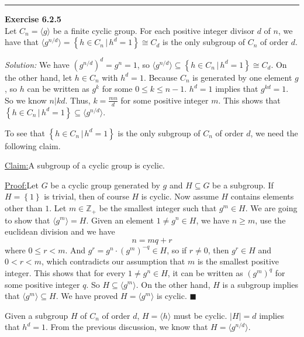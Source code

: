 \documentclass[a4paper, 12pt]{article}
\newenvironment{problem}[2][Exercise]
    { \begin{mdframed}[backgroundcolor=gray!20] \textbf{#1 #2} \\}
    {  \end{mdframed}}
\newenvironment{solution}
    {\textit{Solution:}}
    {}
\newenvironment{claim}[1]{\par\noindent\underline{Claim:}\space#1}{}
\newenvironment{claimproof}[1]{\par\noindent\underline{Proof:}\space#1}{\hfill $\blacksquare$}
\begin{document}
\noindent\rule{7in}{2.8pt}
\begin{problem}{6.2.5}
Let \(C_n=\langle g\rangle\) be a finite cyclic group. For each positive integer divisor \(d\) of \(n\), we have that \(\langle g^{n/d}\rangle =\left\{ h\in C_n\,|\,h^d=1 \right\}\cong C_d\) is 
the only subgroup of \(C_n\) of order \(d\).
\end{problem}
\begin{solution}
We have \((g^{n/d})^d=g^n=1\), so \(\langle g^{n/d}\rangle\subseteq \left\{ h\in C_n\,|\, h^d=1 \right\}\cong C_d\). On the 
other hand, let \(h\in C_n\) with \(h^d=1\). Because \(C_n\) is generated by one element \(g\), so \(h\) can be written as \(g^k\) for some \(0\leq k\leq n-1\). \(h^d=1\) implies that \(g^{kd}=1\). So we know 
\(n|kd\). Thus, \(k=\frac{mn}{d}\) for some positive integer \(m\). This shows that \(\left\{ h\in C_n\,|\, h^d=1 \right\}\subseteq \langle g^{n/d}\rangle\).

To see that \(\left\{ h\in C_n\,|\, h^d=1 \right\}\) is the only subgroup of \(C_n\) of order \(d\), we need the following claim.
\begin{claim}
A subgroup of a cyclic group is cyclic.
\end{claim}
\begin{claimproof}
Let \(G\) be a cyclic group generated by \(g\) and \(H\subseteq G\) be a subgroup. If \(H=\left\{ 1 \right\}\) is trivial, then of course \(H\) is cyclic. Now assume \(H\) contains elements other than \(1\). Let \(m\in \mathbb{Z}_+\) be 
the smallest integer such that \(g^m\in H\). We are going to show that \(\langle g^m\rangle =H\). Given an element \(1\neq g^n\in H\), we have \(n\geq m\), use the euclidean division and we have 
\[n=mq+r\]
where \(0\leq r<m\). And \(g^r=g^n\cdot (g^m)^{-q}\in H\), so if \(r\neq 0\), then \(g^r\in H\) and \(0<r<m\), which contradicts our assumption that \(m\) is the smallest positive integer. This shows that for every \(1\neq g^n\in H\), it can be written as 
\((g^m)^q\) for some positive integer \(q\). So \(H\subseteq \langle g^m\rangle\). On the other hand, \(H\) is a subgroup implies that \(\langle g^m\rangle \subseteq H\). We have proved \(H=\langle g^m\rangle\) is cyclic.
\end{claimproof}

Given a subgroup \(H\) of \(C_n\) of order \(d\), \(H=\langle h\rangle\) must be cyclic. \(|H|=d\) implies that \(h^d=1\). From the previous discussion, we know that \(H=\langle g^{n/d}\rangle\).
\end{solution}
\end{document}
